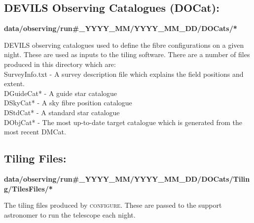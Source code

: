 \documentclass[12pt]{article}
\begin{document}
  
 

 \subsection{DEVILS Observing Catalogues (DOCat):}
 
 \textbf{data/observing/run\#\_YYYY\_MM/YYYY\_MM\_DD/DOCats/*} 
   
DEVILS observing catalogues used to define the fibre configurations on a given night. These are used as inputs to the tiling software. There are a number of files produced in this directory which are:\\

SurveyInfo.txt - A survey description file which explains the field positions and extent.\\
DGuideCat* - A guide star catalogue \\
DSkyCat* - A sky fibre position catalogue \\
DStdCat* - A standard star catalogue \\
DObjCat* - The most up-to-date target catalogue which is generated from the most recent DMCat. \\
 
 
\subsection{Tiling Files:}

 \textbf{data/observing/run\#\_YYYY\_MM/YYYY\_MM\_DD/DOCats/Tiling/TilesFiles/*}
 
 The tiling files produced by \textsc{configure}. These are passed to the support astronomer to run the telescope each night.   
\end{document}
